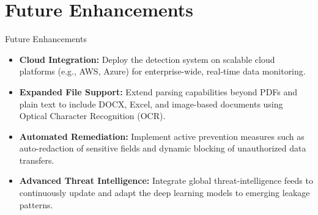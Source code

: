 \documentclass{beamer}
\begin{document}
\section{Future Enhancements}
\begin{frame}{Future Enhancements}
\begin{itemize}
\justifying
    \item \textbf{Cloud Integration:} Deploy the detection system on scalable cloud platforms (e.g., AWS, Azure) for enterprise-wide, real-time data monitoring.
    \item \textbf{Expanded File Support:} Extend parsing capabilities beyond PDFs and plain text to include DOCX, Excel, and image-based documents using Optical Character Recognition (OCR).
    \item \textbf{Automated Remediation:} Implement active prevention measures such as auto-redaction of sensitive fields and dynamic blocking of unauthorized data transfers.
    \item \textbf{Advanced Threat Intelligence:} Integrate global threat-intelligence feeds to continuously update and adapt the deep learning models to emerging leakage patterns.
\end{itemize}
\end{frame}
\end{document}
